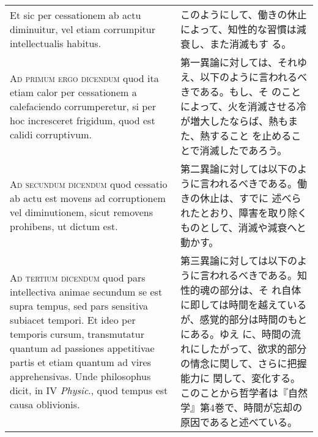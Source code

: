 \documentclass[10pt]{jsarticle} %
\begin{document}
\begin{longtable}{p{21em}p{21em}}
\\


Et sic per cessationem ab actu diminuitur, vel etiam corrumpitur
intellectualis habitus.

&

このようにして、働きの休止によって、知性的な習慣は減衰し、また消滅もす
る。


\\





{\scshape Ad primum ergo dicendum} quod ita etiam calor per
cessationem a calefaciendo corrumperetur, si per hoc incresceret
frigidum, quod est calidi corruptivum.

&


第一異論に対しては、それゆえ、以下のように言われるべきである。もし、そ
のことによって、火を消滅させる冷が増大したならば、熱もまた、熱すること
を止めることで消滅したであろう。

\\



{\scshape Ad secundum dicendum} quod cessatio ab actu est movens ad
corruptionem vel diminutionem, sicut removens prohibens, ut dictum
est.

&

第二異論に対しては以下のように言われるべきである。働きの休止は、すでに
述べられたとおり、障害を取り除くものとして、消滅や減衰へと動かす。

\\



{\scshape Ad tertium dicendum} quod pars intellectiva animae secundum
se est supra tempus, sed pars sensitiva subiacet tempori. Et ideo per
temporis cursum, transmutatur quantum ad passiones appetitivae partis
et etiam quantum ad vires apprehensivas. Unde philosophus dicit, in IV
{\itshape Physic}., quod tempus est causa oblivionis.

&

第三異論に対しては以下のように言われるべきである。知性的魂の部分は、そ
れ自体に即しては時間を越えているが、感覚的部分は時間のもとにある。ゆえ
に、時間の流れにしたがって、欲求的部分の情念に関して、さらに把握能力に
関して、変化する。このことから哲学者は『自然学』第4巻で、時間が忘却の
原因であると述べている。

\end{longtable}
\end{document}
